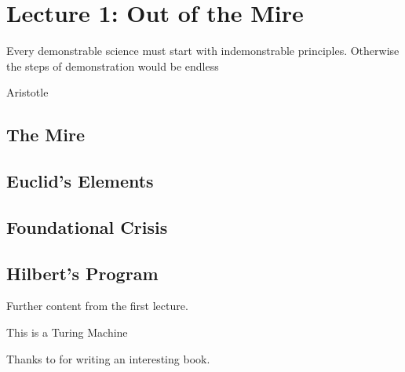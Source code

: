 \documentclass{article}
\begin{document}
\section*{Lecture 1: Out of the Mire}

\epigraph{Every demonstrable science must start with indemonstrable principles. Otherwise the steps of demonstration would be endless}{Aristotle}

\subsection*{\indent The Mire}


\subsection*{\indent Euclid's Elements}


\subsection*{\indent Foundational Crisis}


\subsection*{\indent Hilbert's Program}


\newpage

Further content from the first lecture.

\begin{defn}

This is a Turing Machine

\end{defn}

Thanks to \cite{jdhlectures} for writing an interesting book.





\printbibliography
\end{document}
